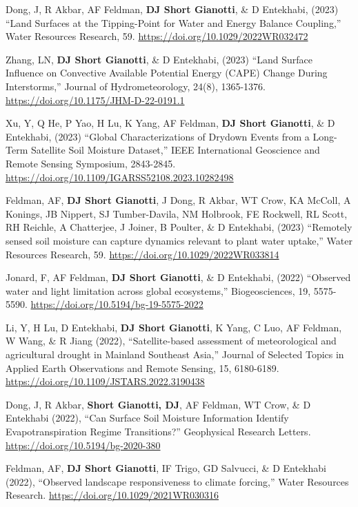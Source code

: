 \documentclass[10pt, a4paper]{article}
\newcommand{\lbr}{\vspace*{12pt}}
\newcommand{\years}[1]{\mbox{}\marginnote{\scriptsize #1}} %
\begin{document}
\years{2023d}Dong, J, R Akbar, AF Feldman, \textbf{DJ Short Gianotti}, \& D Entekhabi, (2023) ``Land Surfaces at the Tipping-Point for Water and Energy Balance Coupling,'' Water Resources Research, 59. \url{https://doi.org/10.1029/2022WR032472}\lbr

\years{2023c}Zhang, LN, \textbf{DJ Short Gianotti}, \& D Entekhabi, (2023) ``Land Surface Influence on Convective Available Potential Energy (CAPE)	Change During Interstorms,'' Journal of Hydrometeorology, 24(8), 1365-1376. \url{https://doi.org/10.1175/JHM-D-22-0191.1}\lbr

\years{2023b}Xu, Y, Q He, P Yao, H Lu, K Yang, AF Feldman, \textbf{DJ Short Gianotti}, \& D Entekhabi, (2023) ``Global Characterizations of Drydown Events from a Long-Term Satellite Soil Moisture Dataset,''  IEEE International Geoscience and Remote Sensing Symposium, 2843-2845. \url{https://doi.org/10.1109/IGARSS52108.2023.10282498}\lbr 

\years{2023a}Feldman, AF, \textbf{DJ Short Gianotti}, J Dong, R Akbar, WT Crow, KA McColl, A Konings, JB Nippert, SJ Tumber-Davila, NM Holbrook, FE Rockwell, RL Scott, RH Reichle, A Chatterjee, J Joiner, B Poulter, \& D Entekhabi, (2023) ``Remotely sensed soil moisture can capture dynamics relevant to plant water uptake,'' Water Resources Research, 59. \url{https://doi.org/10.1029/2022WR033814}\lbr
			
\years{2022d}Jonard, F, AF Feldman, \textbf{DJ Short Gianotti}, \& D Entekhabi, (2022) ``Observed water and light limitation across global ecosystems,'' Biogeosciences, 19, 5575-5590. \url{https://doi.org/10.5194/bg-19-5575-2022}\lbr
	
\years{2022c}Li, Y, H Lu, D Entekhabi, \textbf{DJ Short Gianotti}, K Yang, C Luo, AF Feldman, W Wang, \& R Jiang (2022), ``Satellite-based assessment of meteorological and agricultural drought in Mainland Southeast Asia,'' Journal of Selected Topics in Applied Earth Observations and Remote Sensing, 15, 6180-6189. \url{https://doi.org/10.1109/JSTARS.2022.3190438}\lbr

\years{2022b}Dong, J, R Akbar, \textbf{Short Gianotti, DJ}, AF Feldman, WT Crow, \& D Entekhabi (2022), ``Can Surface Soil Moisture Information Identify 		Evapotranspiration Regime Transitions?'' Geophysical Research Letters. \url{https://doi.org/10.5194/bg-2020-380}\lbr

\years{2022a}Feldman, AF, \textbf{DJ Short Gianotti}, IF Trigo, GD Salvucci, \& D Entekhabi (2022), ``Observed landscape responsiveness to climate forcing,'' Water Resources Research. \url{https://doi.org/10.1029/2021WR030316} \lbr
\end{document}
